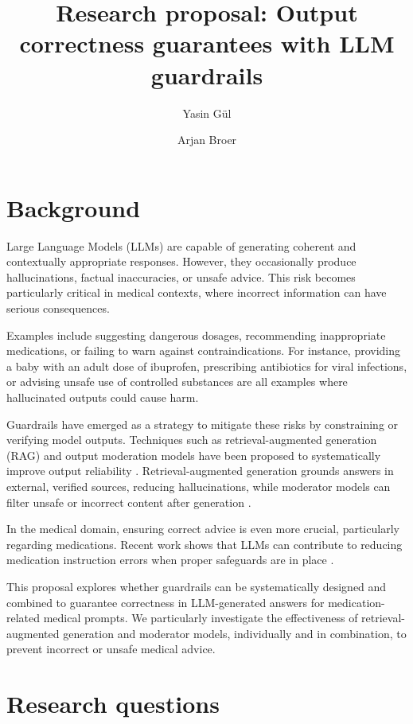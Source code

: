 \documentclass[a4paper,doc,natbib]{apa6}
\title{Research proposal: Output correctness guarantees with LLM guardrails}
\author{Yasin G\"{u}l \and Arjan Broer}
\affiliation{Open University of the Netherlands}
\begin{document}
    \maketitle

    \section{Background}

    Large Language Models (LLMs) are capable of generating coherent and contextually appropriate responses. However, they occasionally produce hallucinations, factual inaccuracies, or unsafe advice. This risk becomes particularly critical in medical contexts, where incorrect information can have serious consequences.

    Examples include suggesting dangerous dosages, recommending inappropriate medications, or failing to warn against contraindications. For instance, providing a baby with an adult dose of ibuprofen, prescribing antibiotics for viral infections, or advising unsafe use of controlled substances are all examples where hallucinated outputs could cause harm.

    Guardrails have emerged as a strategy to mitigate these risks by constraining or verifying model outputs. Techniques such as retrieval-augmented generation (RAG) and output moderation models have been proposed to systematically improve output reliability \citep{dong2024guardrails}. Retrieval-augmented generation grounds answers in external, verified sources, reducing hallucinations, while moderator models can filter unsafe or incorrect content after generation \citep{inan2023llamaguard}.

    In the medical domain, ensuring correct advice is even more crucial, particularly regarding medications. Recent work shows that LLMs can contribute to reducing medication instruction errors when proper safeguards are in place \citep{pais2024medication}.

    This proposal explores whether guardrails can be systematically designed and combined to guarantee correctness in LLM-generated answers for medication-related medical prompts. We particularly investigate the effectiveness of retrieval-augmented generation and moderator models, individually and in combination, to prevent incorrect or unsafe medical advice.

    \section{Research questions}
\end{document}
